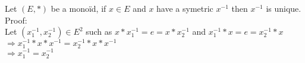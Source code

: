 \documentclass{article}
\begin{document}
\noindent Let $(E, *)$ be a monoïd, if $x \in E$ and $x$
have a symetric $x^{-1}$ then $x^{-1}$ is unique.\\

\noindent Proof:\\
Let $(x^{-1}_1, x^{-1}_2) \in E^2$ such as
$ x * x^{-1}_1 = e = x * x^{-1}_2 $ and
$ x^{-1}_1 * x = e = x^{-1}_2 * x$\\
$\Rightarrow x^{-1}_1 * x * x^{-1} = x^{-1}_2 * x * x^{-1}$
\\
$\Rightarrow x^{-1}_1 = x^{-1}_2$
\end{document}
